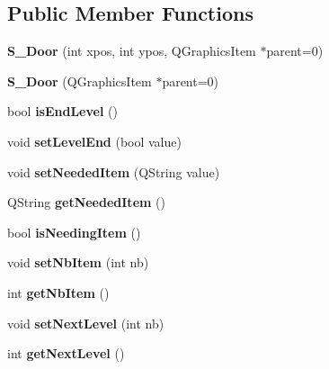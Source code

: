 \subsection*{Public Member Functions}
\begin{DoxyCompactItemize}
\item 
\hypertarget{class_s___door_ae80fd04e83a8fe65009011cd670d2a15}{}{\bfseries S\+\_\+\+Door} (int xpos, int ypos, Q\+Graphics\+Item $\ast$parent=0)\label{class_s___door_ae80fd04e83a8fe65009011cd670d2a15}

\item 
\hypertarget{class_s___door_a439f7ffa4b9d9e0f5fcd943632e6ed56}{}{\bfseries S\+\_\+\+Door} (Q\+Graphics\+Item $\ast$parent=0)\label{class_s___door_a439f7ffa4b9d9e0f5fcd943632e6ed56}

\item 
\hypertarget{class_s___door_a1b9a90f11a9cf518b75e7acffa893dfd}{}bool {\bfseries is\+End\+Level} ()\label{class_s___door_a1b9a90f11a9cf518b75e7acffa893dfd}

\item 
\hypertarget{class_s___door_a26862c2936b36f61027053de131870df}{}void {\bfseries set\+Level\+End} (bool value)\label{class_s___door_a26862c2936b36f61027053de131870df}

\item 
\hypertarget{class_s___door_a66ca6768a47d506c329f330d71e51a40}{}void {\bfseries set\+Needed\+Item} (Q\+String value)\label{class_s___door_a66ca6768a47d506c329f330d71e51a40}

\item 
\hypertarget{class_s___door_ad4388cca8328240695a92b7fad85ff68}{}Q\+String {\bfseries get\+Needed\+Item} ()\label{class_s___door_ad4388cca8328240695a92b7fad85ff68}

\item 
\hypertarget{class_s___door_ac78b4d02bc14f134ab8040c4610261b5}{}bool {\bfseries is\+Needing\+Item} ()\label{class_s___door_ac78b4d02bc14f134ab8040c4610261b5}

\item 
\hypertarget{class_s___door_a7031028a3e58158698e1eee212f553f6}{}void {\bfseries set\+Nb\+Item} (int nb)\label{class_s___door_a7031028a3e58158698e1eee212f553f6}

\item 
\hypertarget{class_s___door_a97b43c424fa12e7f81d42db05185c4f6}{}int {\bfseries get\+Nb\+Item} ()\label{class_s___door_a97b43c424fa12e7f81d42db05185c4f6}

\item 
\hypertarget{class_s___door_a2cf82387100fbaaf1997bff0cb80f61d}{}void {\bfseries set\+Next\+Level} (int nb)\label{class_s___door_a2cf82387100fbaaf1997bff0cb80f61d}

\item 
\hypertarget{class_s___door_a9562af975d74681c491e5172efa7a2d9}{}int {\bfseries get\+Next\+Level} ()\label{class_s___door_a9562af975d74681c491e5172efa7a2d9}

\end{DoxyCompactItemize}


